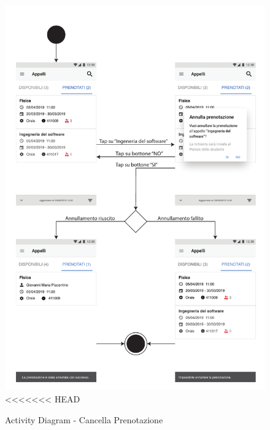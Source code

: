 \begin{figure}
	\centering
	\includegraphics[width=6in]{imgs/gruppo1/activity_diagrams/AD12_cancella_prenotazione.pdf}
<<<<<<< HEAD
	\caption{Activity Diagram - Cancella Prenotazione}
	\label{diag:cancellaPrenotazioneAD}
\end{figure}

\clearpage